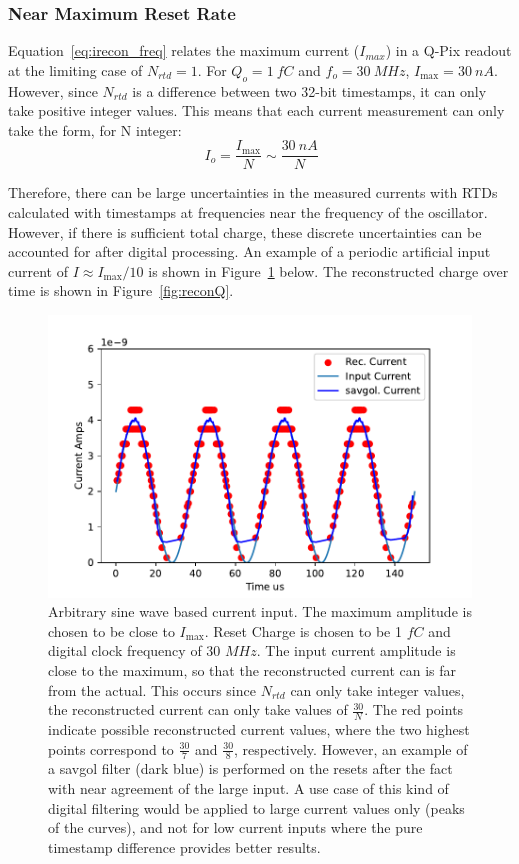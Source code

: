 \subsubsection{Near Maximum Reset Rate}
Equation~\ref{eq:irecon_freq} relates the maximum current ($I_{max}$) in a Q-Pix readout at the limiting case of $N_{rtd} = 1$.
For $Q_{o} = 1~\unit{fC}$ and $f_{o} = 30~\unit{MHz}$, $I_{\mathrm{max}} = 30~\unit{nA}$.
However, since $N_{rtd}$ is a difference between two 32-bit timestamps, it can only take positive integer values.
This means that each current measurement can only take the form, for N integer: 
\begin{equation}~\label{eq:i_max}
I_{o} = \frac{I_{\mathrm{max}}}{N} \sim \frac{30~\unit{nA}}{N}
\end{equation}

Therefore, there can be large uncertainties in the measured currents with RTDs calculated with timestamps at frequencies near the frequency of the oscillator.
However, if there is sufficient total charge, these discrete uncertainties can be accounted for after digital processing.
An example of a periodic artificial input current of $I \approx I_{\mathrm{max}}/10$ is shown in Figure~\ref{fig:savgol} below.
The reconstructed charge over time is shown in Figure~\ref{fig:reconQ}.

\begin{figure}[]
\centering
\includegraphics[width=\textwidth]{images/savgol.pdf}
\caption{Arbitrary sine wave based current input.
The maximum amplitude is chosen to be close to $I_{\mathrm{max}}$.
Reset Charge is chosen to be 1 $\unit{fC}$ and digital clock frequency of 30 $\unit{MHz}$.
The input current amplitude is close to the maximum, so that the reconstructed current can is far from the actual.
This occurs since $N_{rtd}$ can only take integer values, the reconstructed current can only take values of $\frac{30}{N}$.
The red points indicate possible reconstructed current values, where the two highest points correspond to $\frac{30}{7}$ and $\frac{30}{8}$, respectively.
However, an example of a savgol filter (dark blue) is performed on the resets after the fact with near agreement of the large input.
A use case of this kind of digital filtering would be applied to large current values only (peaks of the curves), and not for low current inputs where the pure timestamp difference provides better results.}
\label{fig:savgol}
\end{figure}

